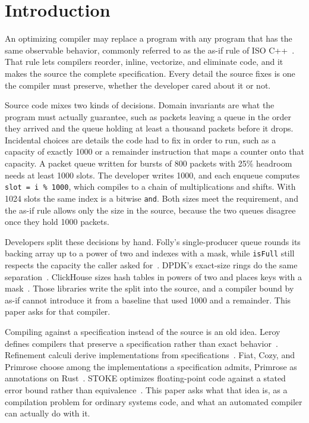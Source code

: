 \section{Introduction}
\label{sec:intro}

An optimizing compiler may replace a program with any program that has the same
observable behavior, commonly referred to as the as-if rule of ISO
C++~\cite{n4950}. That rule lets compilers reorder, inline, vectorize,
and eliminate code, and it makes the source the complete specification. Every
detail the source fixes is one the compiler must preserve, whether the developer
cared about it or not.

Source code mixes two kinds of decisions. Domain invariants are what the program
must actually guarantee, such as packets leaving a queue in the order they
arrived and the queue holding at least a thousand packets before it drops.
Incidental choices are details the code had to fix in order to run, such as a
capacity of exactly 1000 or a remainder instruction that maps a counter onto
that capacity. A packet queue written for bursts of 800 packets with 25\%
headroom needs at least 1000 slots. The developer writes 1000, and each enqueue
computes \texttt{slot = i \% 1000}, which compiles to a chain of multiplications
and shifts. With 1024 slots the same index is a bitwise \texttt{and}. Both sizes
meet the requirement, and the as-if rule allows only the size in the source,
because the two queues disagree once they hold 1000 packets.

Developers split these decisions by hand. Folly's single-producer queue rounds
its backing array up to a power of two and indexes with a mask, while
\texttt{isFull} still respects the capacity the caller asked
for~\cite{folly_pcq}. DPDK's exact-size rings do the same
separation~\cite{dpdk_rte_ring}. ClickHouse sizes hash tables in powers of two
and places keys with a mask~\cite{clickhouse_hashtable}. Those libraries write
the split into the source, and a compiler bound by as-if cannot introduce it from
a baseline that used 1000 and a remainder. This paper asks for that compiler.

Compiling against a specification instead of the source is an old idea. Leroy
defines compilers that preserve a specification rather than exact
behavior~\cite{leroy2009backend}. Refinement calculi derive implementations from
specifications~\cite{back1998refinement,morgan1994programming}. Fiat, Cozy, and
Primrose choose among the implementations a specification admits, Primrose
as annotations on Rust~\cite{delaware2015fiat,loncaric2016cozy,Qin2023Primrose}. STOKE
optimizes floating-point code against a stated error bound rather than
equivalence~\cite{schkufza2014fp}. This paper asks what that idea is, as a
compilation problem for ordinary systems code, and what an automated compiler
can actually do with it.

